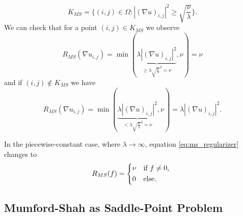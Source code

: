         \begin{equation}
            K_{MS} = \bigg\{ (i, j) \in \Omega : |(\nabla u)_{i, j}|^{2} \ge \sqrt{\frac{\nu}{\lambda}} \bigg\}.
        \label{eq:set_k_ms}
        \end{equation}
    We can check that for a point $(i, j) \in K_{MS}$ we observe
        $$
            R_{MS}(\nabla u_{i, j}) = \min(\underbrace{\lambda|(\nabla u)_{i, j}|^{2}}_{\ge \lambda \sqrt{\frac{\nu}{\lambda}}^{2} = \nu}, \nu) = \nu
        $$
    and if $(i, j) \notin K_{MS}$ we have
        $$
            R_{MS}(\nabla u_{i, j}) = \min(\underbrace{\lambda|(\nabla u)_{i, j}|^{2}}_{< \lambda \sqrt{\frac{\nu}{\lambda}}^{2} = \nu}, \nu) = \lambda|(\nabla u)_{i, j}|^{2}.
        $$

    \begin{remark}
        In the piecewise-constant case, where $\lambda \longrightarrow \infty$, equation \ref{eq:ms_regularizer} changes to
            \begin{equation}
                R_{MS}(f) = 
                    \begin{dcases*}
                        \nu & \textnormal{if $f \ne 0$,} \\
                        0 & \textnormal{else}.
                    \end{dcases*}
            \label{eq:ms_regularizer_piecewise_constant}
            \end{equation}
    \end{remark}

    \subsection{Mumford-Shah as Saddle-Point Problem} %
    \label{sub:mumford_shah_as_saddle_point_problem}

